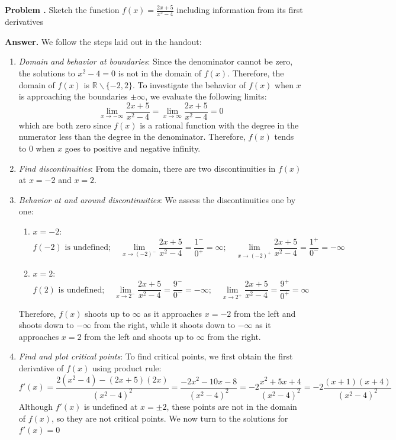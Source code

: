 \documentclass[11pt,letterpaper]{article}
\newcounter{problem}
\newcommand{\problem}{
	\stepcounter{problem}%
	\noindent \textbf{Problem \theproblem. }%
}
\newcommand{\answer}{\noindent \textbf{Answer. }}
\begin{document}
\pagebreak

\problem Sketch the function $f(x) = \frac{2x+5}{x^2-4}$ including information from its first derivatives\vspace{6mm}

\answer We follow the steps laid out in the handout:
\begin{enumerate}
    \item \textit{Domain and behavior at boundaries}: Since the denominator cannot be zero, the solutions to $x^2-4 = 0$ is not in the domain of $f(x)$.  Therefore, the domain of $f(x)$ is $\mathbb{R}\backslash\{-2, 2\}$.  To investigate the behavior of $f(x)$ when $x$ is approaching the boundaries $\pm \infty$, we evaluate the following limits:
    \[\lim_{x\rightarrow-\infty} \frac{2x+5}{x^2-4} = \lim_{x\rightarrow\infty} \frac{2x+5}{x^2-4} = 0\]
    which are both zero since $f(x)$ is a rational function with the degree in the numerator less than the degree in the denominator.  Therefore, $f(x)$ tends to $0$ when $x$ goes to positive and negative infinity.
    \item \textit{Find discontinuities}: From the domain, there are two discontinuities in $f(x)$ at $x=-2$ and $x=2$.
    \item \textit{Behavior at and around discontinuities}: We assess the discontinuities one by one:
    \begin{enumerate}
        \item $x = -2$:
        \[f(-2) \text{ is undefined}; \quad \lim_{x\rightarrow (-2)^-}\frac{2x+5}{x^2-4} = \frac{1^-}{0^+} = \infty; \quad \lim_{x\rightarrow (-2)^+}\frac{2x+5}{x^2-4} = \frac{1^+}{0^-} = -\infty\]
        \item $x = 2$:
        \[f(2) \text{ is undefined}; \quad \lim_{x\rightarrow 2^-}\frac{2x+5}{x^2-4} = \frac{9^-}{0^-} = -\infty; \quad \lim_{x\rightarrow 2^+}\frac{2x+5}{x^2-4} = \frac{9^+}{0^+} = \infty\]
    \end{enumerate}
    Therefore, $f(x)$ shoots up to $\infty$ as it approaches $x = -2$ from the left and shoots down to $-\infty$ from the right, while it shoots down to $-\infty$ as it approaches $x = 2$ from the left and shoots up to $\infty$ from the right.
    \item \textit{Find and plot critical points}: To find critical points, we first obtain the first derivative of $f(x)$ using product rule:
    \[f'(x) = \frac{2(x^2-4)-(2x+5)(2x)}{(x^2-4)^2}=\frac{-2x^2-10x-8}{(x^2-4)^2}=-2\frac{x^2+5x+4}{(x^2-4)^2}=-2\frac{(x+1)(x+4)}{(x^2-4)^2}\]
    Although $f'(x)$ is undefined at $x = \pm 2$, these points are not in the domain of $f(x)$, so they are not critical points.  We now turn to the solutions for $f'(x) = 0$

\end{enumerate}
\end{document}
